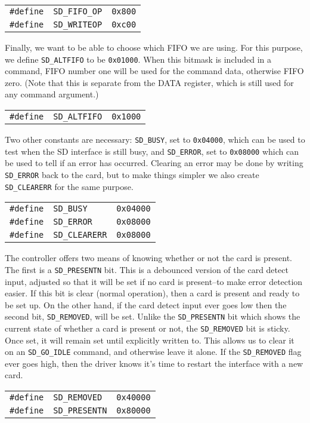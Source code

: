 \documentclass{gqtekspec}
\begin{document}
\begin{tabular}{lll}
{\tt \#define} & {\tt SD\_FIFO\_OP} & {\tt 0x800} \\
{\tt \#define} & {\tt SD\_WRITEOP}  & {\tt 0xc00}
\end{tabular}

Finally, we want to be able to choose which FIFO we are using.  For this
purpose, we define {\tt SD\_ALTFIFO} to be {\tt 0x01000}.  When this bitmask
is included in a command, FIFO number one will be used for the command data,
otherwise FIFO zero.  (Note that this is separate from the DATA register,
which is still used for any command argument.)

\begin{tabular}{lll}
{\tt \#define} & {\tt SD\_ALTFIFO} & {\tt 0x1000}
\end{tabular}

Two other constants are necessary: {\tt SD\_BUSY}, set to {\tt 0x04000}, which
can be used to test when the SD interface is still busy, and {\tt SD\_ERROR},
set to {\tt 0x08000} which can be used to tell if an error has occurred.
Clearing an error may be done by writing {\tt SD\_ERROR} back to the card, but
to make things simpler we also create {\tt SD\_CLEARERR} for the same purpose.

\begin{tabular}{lll}
{\tt \#define} & {\tt SD\_BUSY}     & {\tt 0x04000} \\
{\tt \#define} & {\tt SD\_ERROR}    & {\tt 0x08000} \\
{\tt \#define} & {\tt SD\_CLEARERR} & {\tt 0x08000}
\end{tabular}

The controller offers two means of knowing whether or not the card is present.
The first is a {\tt SD\_PRESENTN} bit.  This is a debounced version of the
card detect input, adjusted so that it will be set if no card is present--to
make error detection easier.  If this bit is clear (normal
operation), then a card is present and ready to be set up.  On the other hand,
if the card detect input ever goes low then the second bit, {\tt SD\_REMOVED},
will be set.  Unlike the {\tt SD\_PRESENTN} bit which shows the current state
of whether a card is present or not, the {\tt SD\_REMOVED} bit is sticky.
Once set, it will remain set until explicitly written to.  This allows us to
clear it on an {\tt SD\_GO\_IDLE} command, and
otherwise leave it alone.  If the {\tt SD\_REMOVED} flag ever goes high, then
the driver knows it's time to restart the interface with a new card.
\begin{tabular}{lll}
{\tt \#define} & {\tt SD\_REMOVED}  & {\tt 0x40000} \\
{\tt \#define} & {\tt SD\_PRESENTN} & {\tt 0x80000}
\end{tabular}
\end{document}
